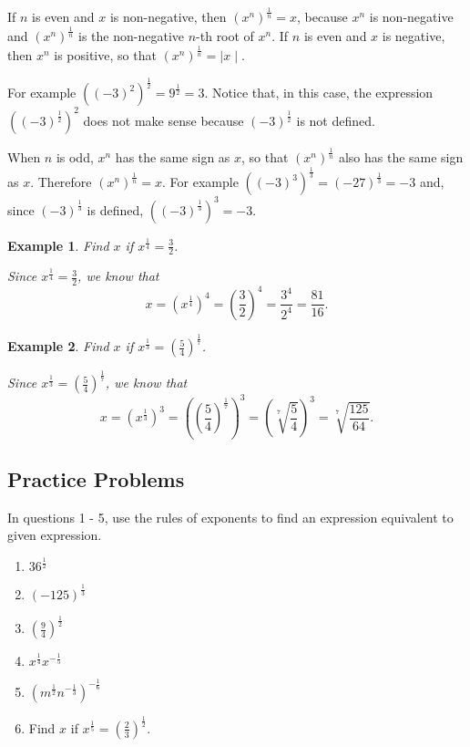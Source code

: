 \documentclass[11pt]{book}               %
\newtheorem{example}{Example}
\begin{document}
If $n$ is even and $x$ is non-negative, 
then $(x^n)^\frac{1}{n} = x$, because $x^n$ is non-negative and $(x^n)^\frac{1}{n}$ is the non-negative $n$-th root of $x^n$. 
If $n$ is even and $x$ is negative, then $x^n$ is positive, so that $(x^n)^\frac{1}{n}=\mid x \mid$. 

For example $((-3)^2)^\frac{1}{2}= 9^\frac{1}{2}=3$. Notice that, in this case, the expression $\left((-3)^\frac{1}{2}\right)^2$ does not make sense because $(-3)^\frac{1}{2}$ is not defined. 

When $n$ is odd, $x^n$ has the same sign as $x$, so that $(x^n)^\frac{1}{n}$ also has the same sign as $x$. 
Therefore $(x^n)^\frac{1}{n}=x$. For example $((-3)^3)^{\frac{1}{3}} = (-27)^{\frac{1}{3}}=-3$ and, since $(-3)^{\frac{1}{3}}$ is defined, $\left((-3)^\frac{1}{3}\right)^3=-3$. 


\begin{example}
Find $x$ if $x^\frac{1}{4} = \frac{3}{2}$.

\normalfont
Since $x^\frac{1}{4} = \frac{3}{2}$, we know that 
$$x = \left(x^\frac{1}{4}\right)^4 = \left(\frac{3}{2}\right)^4 = \frac{3^4}{2^4} = \frac{81}{16}.$$

\end{example}

\begin{example}
Find $x$ if $x^\frac{1}{3} = \left(\frac{5}{4}\right)^\frac{1}{7}$.

\normalfont
Since $x^\frac{1}{3} = \left(\frac{5}{4}\right)^\frac{1}{7}$, we know that 
$$x = \left(x^\frac{1}{3}\right)^{3} 
= \left(\left(\frac{5}{4}\right)^\frac{1}{7}\right)^{3}  
=  \left(\sqrt[7]{\frac{5}{4}}\right)^{3} = \sqrt[7]{\frac{125}{64}} .$$

\end{example}



\subsection{Practice Problems}

In questions 1 - 5, use the rules of exponents to find an expression equivalent to given expression.
\begin{enumerate}
\item $ 36^\frac{1}{2} $ 
\item $ (-125)^\frac{1}{3} $ 
\item $ (\frac{9}{4})^\frac{1}{2} $ 
\item $x^\frac{1}{4}x^{-\frac{1}{5}} $ 
\item $ (m^\frac{1}{2}n^{-\frac{1}{3}})^{-\frac{1}{6}}$

\bigskip
\item Find $x$ if $x^\frac{1}{5} = \left(\frac{2}{3}\right)^\frac{1}{2}$.
\end{enumerate}
\end{document}
